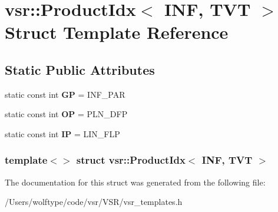 \hypertarget{structvsr_1_1_product_idx_3_01_i_n_f_00_01_t_v_t_01_4}{\section{vsr\-:\-:Product\-Idx$<$ I\-N\-F, T\-V\-T $>$ Struct Template Reference}
\label{structvsr_1_1_product_idx_3_01_i_n_f_00_01_t_v_t_01_4}
}
\subsection*{Static Public Attributes}
\begin{DoxyCompactItemize}
\item 
\hypertarget{structvsr_1_1_product_idx_3_01_i_n_f_00_01_t_v_t_01_4_a79601676db637a958f58a204c8d932d0}{static const int {\bfseries G\-P} = I\-N\-F\-\_\-\-P\-A\-R}\label{structvsr_1_1_product_idx_3_01_i_n_f_00_01_t_v_t_01_4_a79601676db637a958f58a204c8d932d0}

\item 
\hypertarget{structvsr_1_1_product_idx_3_01_i_n_f_00_01_t_v_t_01_4_ad0867f13f67ed801a5c8c6f7d5da780b}{static const int {\bfseries O\-P} = P\-L\-N\-\_\-\-D\-F\-P}\label{structvsr_1_1_product_idx_3_01_i_n_f_00_01_t_v_t_01_4_ad0867f13f67ed801a5c8c6f7d5da780b}

\item 
\hypertarget{structvsr_1_1_product_idx_3_01_i_n_f_00_01_t_v_t_01_4_a3ec6edbc5b8f1703724abd1e6ffe5e6e}{static const int {\bfseries I\-P} = L\-I\-N\-\_\-\-F\-L\-P}\label{structvsr_1_1_product_idx_3_01_i_n_f_00_01_t_v_t_01_4_a3ec6edbc5b8f1703724abd1e6ffe5e6e}

\end{DoxyCompactItemize}
\subsubsection*{template$<$$>$ struct vsr\-::\-Product\-Idx$<$ I\-N\-F, T\-V\-T $>$}



The documentation for this struct was generated from the following file\-:\begin{DoxyCompactItemize}
\item 
/\-Users/wolftype/code/vsr/\-V\-S\-R/vsr\-\_\-templates.\-h\end{DoxyCompactItemize}
